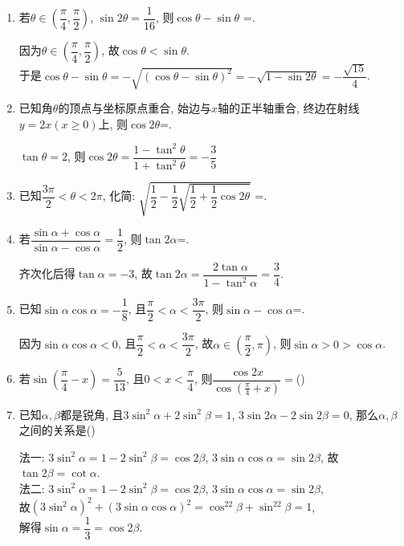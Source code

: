 \begin{enumerate}
\item 若$\theta\in\left(\dfrac{\pi}{4},\dfrac{\pi}{2}\right)$, $\sin2\theta=\dfrac{1}{16}$, 则$\cos\theta-\sin\theta$ =. 
\begin{jieda}
因为$\theta\in\left(\dfrac{\pi}{4},\dfrac{\pi}{2}\right)$, 故$\cos\theta<\sin\theta$. \\
于是$\cos\theta-\sin\theta=-\sqrt{(\cos\theta-\sin\theta)^2}=-\sqrt{1-\sin2\theta}=-\dfrac{\sqrt{15}}{4}$. 
\end{jieda}

\item 已知角$\theta$的顶点与坐标原点重合, 始边与$x$轴的正半轴重合, 终边在射线$y=2x(x\geq 0)$上, 则$\cos2\theta$=. 
\begin{jieda}
$\tan\theta=2$, 则$\cos2\theta=\dfrac{1-\tan^2\theta}{1+\tan^2\theta}=-\dfrac{3}{5}$
\end{jieda}


\item 已知$\dfrac{3\pi}{2}<\theta<2\pi$, 化简: $\sqrt{\dfrac{1}{2}-\dfrac{1}{2}\sqrt{\dfrac{1}{2}+\dfrac{1}{2}\cos2\theta}}$ =. 

\item 若$\dfrac{\sin\alpha+\cos\alpha}{\sin\alpha-\cos\alpha}=\dfrac{1}{2}$, 则$\tan2\alpha$=. 
\begin{jieda}
齐次化后得$\tan\alpha=-3$, 故$\tan2\alpha=\dfrac{2\tan\alpha}{1-\tan^2\alpha}=\dfrac{3}{4}$. 
\end{jieda}

\item 已知$\sin\alpha\cos\alpha=-\dfrac{1}{8}$, 且$\dfrac{\pi}{2}<\alpha<\dfrac{3\pi}{2}$, 则$\sin\alpha-\cos\alpha$=. 
\begin{jieda}
因为$\sin\alpha\cos\alpha<0$, 且$\dfrac{\pi}{2}<\alpha<\dfrac{3\pi}{2}$, 故$\alpha\in\left(\dfrac{\pi}{2},\pi\right)$, 则$\sin\alpha>0>\cos\alpha$. 
\end{jieda}

\item 若$\sin\left(\dfrac{\pi}{4}-x\right)=\dfrac{5}{13}$, 且$0<x<\dfrac{\pi}{4}$, 则$\dfrac{\cos2x}{\cos(\frac{\pi}{4}+x)}=$\dotfill()

\item 已知$\alpha,\beta$都是锐角, 且$3\sin^2\alpha+2\sin^2\beta=1$, $3\sin2\alpha-2\sin2\beta=0$, 那么$\alpha,\beta$之间的关系是\dotfill()
\begin{jieda}
法一: $3\sin^2\alpha=1-2\sin^2\beta=\cos2\beta$, $3\sin\alpha\cos\alpha=\sin2\beta$, 故$\tan2\beta=\cot\alpha$. \\
法二: $3\sin^2\alpha=1-2\sin^2\beta=\cos2\beta$, $3\sin\alpha\cos\alpha=\sin2\beta$,\\
故$\left(3\sin^2\alpha\right)^2+\left(3\sin\alpha\cos\alpha\right)^2=\cos^22\beta+\sin^22\beta=1$, \\
解得$\sin\alpha=\dfrac{1}{3}=\cos2\beta$. 
\end{jieda}


\end{enumerate}
